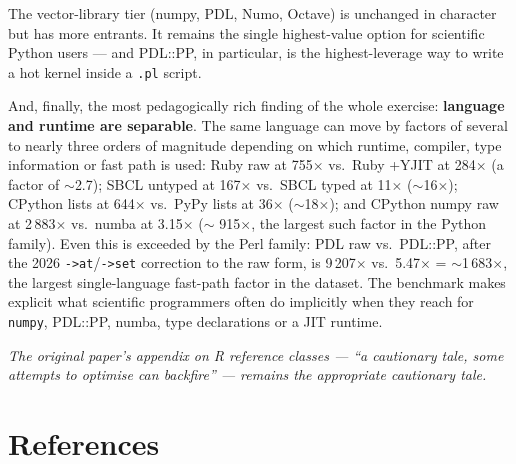 \documentclass[11pt,a4paper]{article}
\begin{document}
The vector-library tier (numpy, PDL, Numo, Octave) is unchanged in
character but has more entrants. It remains the single
highest-value option for scientific Python users --- and PDL::PP, in
particular, is the highest-leverage way to write a hot kernel inside
a \texttt{.pl} script.

And, finally, the most pedagogically rich finding of the whole
exercise: \textbf{language and runtime are separable}. The same
language can move by factors of several to nearly three orders of
magnitude depending on which runtime, compiler, type information or
fast path is used: Ruby raw at 755$\times$ vs.~Ruby +YJIT at
284$\times$ (a factor of $\sim$2.7); SBCL untyped at 167$\times$
vs.~SBCL typed at 11$\times$ ($\sim$16$\times$); CPython lists at
644$\times$ vs.~PyPy lists at 36$\times$ ($\sim$18$\times$); and
CPython numpy raw at 2\,883$\times$ vs.~numba at 3.15$\times$ ($\sim$
915$\times$, the largest such factor in the Python family). Even
this is exceeded by the Perl family: PDL raw vs.~PDL::PP, after the
2026 \texttt{->at}/\texttt{->set} correction to the raw form, is
9\,207$\times$ vs.~5.47$\times$ = $\sim$1\,683$\times$, the largest
single-language fast-path factor in the dataset. The benchmark makes explicit what
scientific programmers often do implicitly when they reach for
\texttt{numpy}, PDL::PP, numba, type declarations or a JIT runtime.

\bigskip
\noindent
\textit{The original paper's appendix on R reference classes ---
``a cautionary tale, some attempts to optimise can backfire'' ---
remains the appropriate cautionary tale.}

\section*{References}
\end{document}
